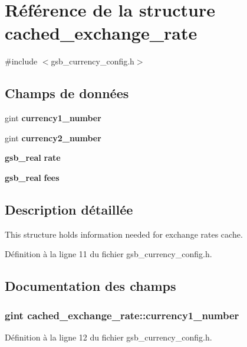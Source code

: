\section{Référence de la structure cached\_\-exchange\_\-rate}
\label{structcached__exchange__rate}


{\ttfamily \#include $<$gsb\_\-currency\_\-config.h$>$}

\subsection*{Champs de données}
\begin{DoxyCompactItemize}
\item 
gint {\bf currency1\_\-number}
\item 
gint {\bf currency2\_\-number}
\item 
{\bf gsb\_\-real} {\bf rate}
\item 
{\bf gsb\_\-real} {\bf fees}
\end{DoxyCompactItemize}


\subsection{Description détaillée}
This structure holds information needed for exchange rates cache. 

Définition à la ligne 11 du fichier gsb\_\-currency\_\-config.h.



\subsection{Documentation des champs}
\subsubsection[{currency1\_\-number}]{\setlength{\rightskip}{0pt plus 5cm}gint {\bf cached\_\-exchange\_\-rate::currency1\_\-number}}\label{structcached__exchange__rate_a57f3f2ae5b09a0edcfddcd7479ecdcfd}


Définition à la ligne 12 du fichier gsb\_\-currency\_\-config.h.


